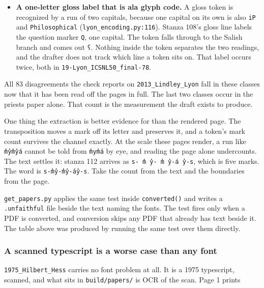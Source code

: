 \begin{itemize}
\item \textbf{A one-letter gloss label that is ala glyph code.} A gloss token is recognized by a run of two capitals, because one capital on its own is also \texttt{i\allowbreak{}P} and \texttt{Philosophical} (\texttt{lyon\_\allowbreak{}encoding.\allowbreak{}py:116}). Stanza 108's gloss line labels the question marker \texttt{Q}, one capital. The token falls through to the Salish branch and comes out \texttt{ʕ}. Nothing inside the token separates the two readings, and the drafter does not track which line a token sits on. That label occurs twice, both in \texttt{19-\allowbreak{}Lyon\_\allowbreak{}ICSNL50\_\allowbreak{}final-\allowbreak{}78}.
\end{itemize}

All 83 disagreements the check reports on \texttt{2013\_\allowbreak{}Lindley\_\allowbreak{}Lyon} fall in these classes now that it has been read off the pages in full. The last two classes occur in the priests paper alone. That count is the measurement the draft exists to produce.

One thing the extraction is better evidence for than the rendered page. The transposition moves a mark off its letter and preserves it, and a token's mark count survives the channel exactly. At the scale these pages render, a run like \texttt{m̓y̓m̓y̓á} cannot be told from \texttt{m̓ym̓á} by eye, and reading the page alone undercounts. The text settles it: stanza 112 arrives as \texttt{s-\allowbreak{} m̓ y̓-\allowbreak{} m̓ y̓-\allowbreak{}á y̓-\allowbreak{}s}, which is five marks. The word is \texttt{s-\allowbreak{}m̓y̓-\allowbreak{}m̓y̓-\allowbreak{}áy̓-\allowbreak{}s}. Take the count from the text and the boundaries from the page.

\texttt{get\_\allowbreak{}papers.\allowbreak{}py} applies the same test inside \texttt{converted()} and writes a \texttt{.\allowbreak{}unfaithful} file beside the text naming the fonts. The test fires only when a PDF is converted, and conversion skips any PDF that already has text beside it. The table above was produced by running the same test over them directly.

\subsubsection{A scanned typescript is a worse case than any font}

\texttt{1975\_\allowbreak{}Hilbert\_\allowbreak{}Hess} carries no font problem at all. It is a 1975 typescript, scanned, and what sits in \texttt{build/\allowbreak{}papers/\allowbreak{}} is OCR of the scan. Page 1 prints

